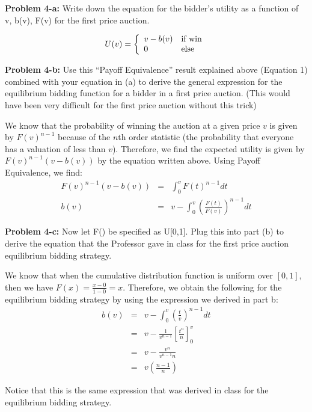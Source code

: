 \documentclass[psamsfonts]{amsart}
\newenvironment{sol}{\vspace{0.25cm}{\large \bfseries Solution:}}{\qedsymbol}
\newenvironment{prob}[1]{\begin{framed}{\large \bfseries Problem #1:}}{\end{framed}}
\begin{document}
\begin{prob}{4-a}
Write down the equation for the bidder’s utility as a function of v, b(v), F(v) for the first price auction.
\end{prob}
\begin{sol}
\begin{eqnarray}
U(v) = \left\{ \begin{array}{l l}
v - b(v) & \text{if win} \\
0 & \text{else}
\end{array} \right.
\end{eqnarray}
\end{sol}

\begin{prob}{4-b}
Use this “Payoff Equivalence” result explained above (Equation 1) combined with your equation in (a) to derive the general expression for the equilibrium bidding function for a
bidder in a first price auction. (This would have been very difficult for the first price auction without this trick)
\end{prob}
\begin{sol}
We know that the probability of winning the auction at a given price $v$ is given by $F(v)^{n-1}$ because of the $n$th order statistic (the probability that everyone has a valuation of less than $v$). Therefore, we find the expected utility is given by $F(v)^{n-1} (v - b(v))$ by the equation written above. Using Payoff Equivalence, we find:
\begin{eqnarray}
F(v)^{n-1} (v - b(v)) &=& \int_{0}^{v} F(t)^{n-1} dt \\
b(v) &=& v - \int_{0}^v \left( \frac{F(t)}{F(v)} \right)^{n-1} dt 
\end{eqnarray}
\end{sol}

\begin{prob}{4-c}
Now let F() be specified as U[0,1]. Plug this into part (b) to derive the equation that the Professor gave in class for the first price auction equilibrium bidding strategy.
\end{prob}
\begin{sol}
We know that when the cumulative distribution function is uniform over $[0,1]$, then we have $F(x) = \frac{x-0}{1-0} = x$. Therefore, we obtain the following for the equilibrium bidding strategy by using the expression we derived in part b:
\begin{eqnarray}
b(v) &=& v - \int_0^v \left( \frac{t}{v} \right)^{n-1} dt \\
&=& v - \frac{1}{v^{n-1}} \left[ \frac{t^n}{n} \right]_0^v \\
&=& v - \frac{v^n}{v^{n-1} n } \\
&=& v \left( \frac{n-1}{n} \right)
\end{eqnarray}

Notice that this is the same expression that was derived in class for the equilibrium bidding strategy.
\end{sol}
\end{document}
